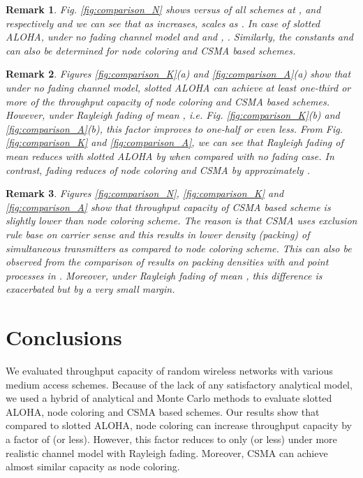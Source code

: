\documentclass[12pt,english]{article}
\newtheorem{remark}{Remark}[section]
\begin{document}
\begin{remark}
Fig. \ref{fig:comparison_N} shows  versus  of all schemes at ,  and  respectively and we can see that as  increases,  scales as . In case of slotted ALOHA, under {\em no fading} channel model and \mbox{} and \mbox{}, . Similarly, the constants  and  can also be determined for node coloring and CSMA based schemes. 
\end{remark}

\begin{remark}
Figures \ref{fig:comparison_K}(a) and \ref{fig:comparison_A}(a) show that under {\em no fading} channel model, slotted ALOHA can achieve {\em at least} one-third or more of the throughput capacity of node coloring and CSMA based schemes. However, under {\em Rayleigh fading} of mean , {\it i.e.} Fig. \ref{fig:comparison_K}(b) and \ref{fig:comparison_A}(b), this factor improves to one-half or even less. From Fig. \ref{fig:comparison_K} and \ref{fig:comparison_A}, we can see that {\em Rayleigh fading} of mean  reduces  with slotted ALOHA by \mbox{} when compared with {\em no fading} case. In contrast, fading reduces  of node coloring and CSMA by approximately . 
\end{remark}

\begin{remark}
Figures \ref{fig:comparison_N}, \ref{fig:comparison_K} and \ref{fig:comparison_A} show that throughput capacity of CSMA based scheme is slightly lower than node coloring scheme. The reason is that CSMA uses exclusion rule base on carrier sense and this results in lower density (packing) of simultaneous transmitters as compared to node coloring scheme. This can also be observed from the comparison of results on packing densities with  and  point processes in \cite{Busson}. Moreover, under {\em Rayleigh fading} of mean , this difference is exacerbated but by a very small margin.
\end{remark}

\section{Conclusions}
\label{sec:conclude}

We evaluated throughput capacity of random wireless networks with various medium access schemes. Because of the lack of any satisfactory analytical model, we used a hybrid of analytical and Monte Carlo methods to evaluate slotted ALOHA, node coloring and CSMA based schemes. Our results show that compared to slotted ALOHA, node coloring can increase throughput capacity by a factor of  (or less). However, this factor reduces to only  (or less) under more realistic channel model with Rayleigh fading. Moreover, CSMA can achieve almost similar capacity as node coloring. 
\end{document}
